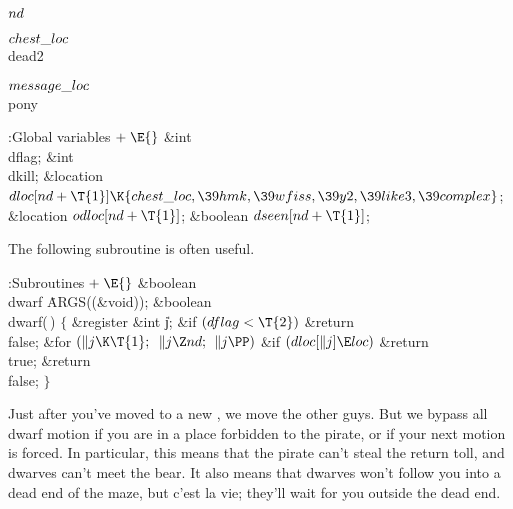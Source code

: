 \Y\B\4\D$\\{nd}$ \5
\par
\B\4\D$\\{chest\_loc}$ \5
\\{dead2}\par
\B\4\D$\\{message\_loc}$ \5
\\{pony}\par
\Y\B\4:Global variables\X${}\mathrel+\E{}$\6
\&{int} \\{dflag};\6
\&{int} \\{dkill};\6
\&{location} ${}\\{dloc}[\\{nd}+\T{1}]\K\{\\{chest\_loc},\39\\{hmk},\39%
\\{wfiss},\39\\{y2},\39\\{like3},\39\\{complex}\}{}$;\6
\&{location} ${}\\{odloc}[\\{nd}+\T{1}]{}$;\6
\&{boolean} ${}\\{dseen}[\\{nd}+\T{1}]{}$;\par
\fi

The following subroutine is often useful.

\Y\B\4:Subroutines\X${}\mathrel+\E{}$\6
\&{boolean} \\{dwarf}\,\,\.{ARGS}((\&{void}));\7
\&{boolean} \\{dwarf}(\,)\6
${}\{{}$\1\6
\&{register} \&{int} \|j;\7
\&{if} ${}(\\{dflag}<\T{2}){}$\1\5
\&{return} \\{false};\2\6
\&{for} ${}(\|j\K\T{1};{}$ ${}\|j\Z\\{nd};{}$ ${}\|j\PP){}$\1\6
\&{if} ${}(\\{dloc}[\|j]\E\\{loc}){}$\1\5
\&{return} \\{true};\2\2\6
\&{return} \\{false};\6
\4${}\}{}$\2\par
\fi

Just after you've moved to a new , we move the other guys.
But we bypass all dwarf motion if you are in a place forbidden
to the pirate, or if your next motion is forced. In particular,
this means that the pirate can't steal the return toll, and
dwarves can't meet the bear.  It also means that dwarves won't
follow you into a dead end of the maze, but c'est la vie; they'll
wait for you outside the dead end.

